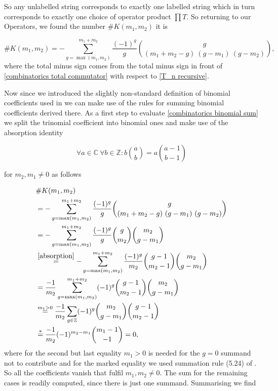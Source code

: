\documentclass[b5paper,draft,openbib,12pt]{memoir}
\begin{document}
So any unlabelled  string corresponds to exactly one labelled string which in turn corresponds to 
exactly one choice of operator product \(\prod T\). 
So returning to our Operators, we found the number \(\#K(m_1,m_2)\) it is

\begin{equation}\label{combinatorics binomial sum}
\#K(m_1,m_2) =-\sum_{g=\max(m_1,m_2)}^{m_1+m_2} \frac{(-1)^g}{g} \binom{g}{(m_1+m_2-g) \ (g-m_1) \ (g - m_2)},
\end{equation}
where the total minus sign comes from the total minus sign in front of \eqref{combinatorics total commutator}
with respect to \eqref{T_n recursive}. 

Now since we introduced the slightly non-standard definition of binomial coefficients used in \cite{graham1994concrete} we
can make use of the rules for summing binomial coefficients derived there.
As a first step to evaluate \eqref{combinatorics binomial sum} we split the trinomial coefficient into binomial
ones and make use of the absorption identity

\begin{equation}\tag{absorption}\label{absorption}
\forall a \in \mathbb{C}\ \forall b \in \mathbb{Z}: b \binom{a}{b} = a \binom{a-1}{b-1} 
\end{equation}

for \(m_2,m_1\neq 0\) as follows

\begin{align*}
&\#K(m_1,m_2) \\
&=-\sum_{g=\max(m_1,m_2)}^{m_1+m_2} \frac{(-1)^g}{g} \binom{g}{(m_1+m_2-g) \ (g-m_1) \ (g - m_2)}\\
&=-\sum_{g=\max(m_1,m_2)}^{m_1+m_2} \frac{(-1)^g}{g} \binom{g}{m_2}\binom{m_2}{g-m_1}\\
&\stackrel{\eqref{absorption}}{=}-\sum_{g=\max(m_1,m_2)}^{m_1+m_2} \frac{(-1)^g}{m_2} \binom{g-1}{m_2-1}\binom{m_2}{g-m_1}\\
&=\frac{-1}{m_2} \sum_{g=\max(m_1,m_2)}^{m_1+m_2} (-1)^g \binom{g-1}{m_2-1}\binom{m_2}{g-m_1}\\
&\overset{m_1>0}{=}\frac{-1}{m_2} \sum_{g\in\mathbb{Z}} (-1)^g \binom{m_2}{g-m_1}\binom{g-1}{m_2-1}\\
&\stackrel{*}{=} \frac{-1}{m_2} (-1)^{m_2-m_1} \binom{m_1-1}{-1} = 0,
\end{align*}
where for the second but last equality \(m_1>0\) is needed for the \(g=0\) summand not to contribute and
for the marked equality we used summation rule (5.24) of \cite{graham1994concrete}. 
So all the coefficients vanish that fulfil \(m_1,m_2\neq 0\). The sum for the remaining cases
is readily computed, since there is just one summand. Summarising we find
\end{document}

